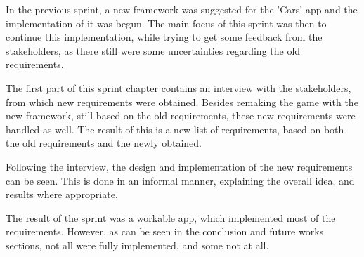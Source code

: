 In the previous sprint, a new framework was suggested for the 'Cars' app and the implementation of it was begun.
The main focus of this sprint was then to continue this implementation, while trying to get some feedback from the stakeholders, as there still were some uncertainties regarding the old requirements.

The first part of this sprint chapter contains an interview with the stakeholders, from which new requirements were obtained.
Besides remaking the game with the new framework, still based on the old requirements, these new requirements were handled as well.
The result of this is a new list of requirements, based on both the old requirements and the newly obtained.

Following the interview, the design and implementation of the new requirements can be seen.
This is done in an informal manner, explaining the overall idea, and results where appropriate.

The result of the sprint was a workable app, which implemented most of the requirements.
However, as can be seen in the conclusion and future works sections, not all were fully implemented, and some not at all.